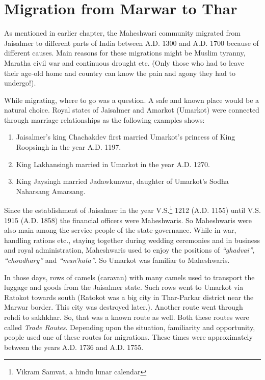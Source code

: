 \chapter{Migration from Marwar to Thar}
As mentioned in earlier chapter, the Maheshwari community migrated from
Jaisalmer to different parts of India between A.D. 1300 and A.D. 1700 because
of different causes. Main reasons for these migrations might be Muslim tyranny,
Maratha civil war and continuous drought etc. (Only those who had to leave
their age-old home and country can know the pain and agony they had to
undergo!).

While migrating, where to go was a question. A safe and known place would be a
natural choice. Royal states of Jaisalmer and Amarkot (Umarkot) were connected
through marriage relationships as the following examples shows:

\begin{enumerate}
 \item Jaisalmer's king Chachakdev first married Umarkot's princess of King Roopsingh in the year A.D. 1197.
\item King Lakhansingh married in Umarkot in the year A.D. 1270.
\item King Jaysingh married Jadawkunwar, daughter of Umarkot's Sodha Naharsang Amarsang.
\end{enumerate}

Since the establishment of Jaisalmer in the year V.S.\footnote{Vikram Samvat, a
hindu lunar calendar} 1212 (A.D. 1155) until V.S. 1915 (A.D. 1858) the
financial officers were Maheshwaris. So Maheshwaris were also main among the
service people of the state governance. While in war, handling rations etc.,
staying together during wedding ceremonies and in business and royal
administration, Maheshwaris used to enjoy the positions of \textit{``ghadvai''},
\textit{``choudhary''} and \textit{``mun'hata''}. So Umarkot was familiar to Maheshwaris.

In those days, rows of camels (caravan) with many camels used to transport the
luggage and goods from the Jaisalmer state. Such rows went to Umarkot via
Ratokot towards south (Ratokot was a big city in Thar-Parkar district near the
Marwar border. This city was destroyed later.). Another route went through
rohdi to sakhkhar. So, that was a known route as well. Both these routes were
called \textit{Trade Routes}. Depending upon the situation, familiarity and
opportunity, people used one of these routes for migrations. These times were
approximately between the years A.D. 1736 and A.D. 1755.

